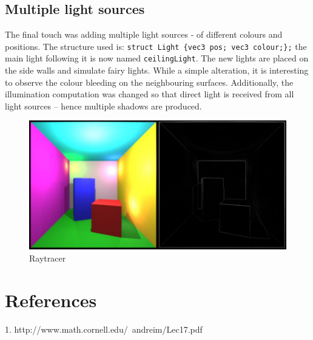 \documentclass[DIV=calc, paper=a4, fontsize=11pt, twocolumn]{article}	 %
\begin{document}
	\subsection*{Multiple light sources}
	The final touch was adding multiple light sources - of different colours and positions. The structure used is: \texttt{struct Light \{vec3 pos; vec3 colour;\};} the main light following it is now named \texttt{ceilingLight}. The new lights are placed on the side walls and simulate fairy lights. While a simple alteration, it is interesting to observe the colour bleeding on the neighbouring surfaces. Additionally, the illumination computation was changed so that direct light is received from all light sources -- hence multiple shadows are produced.
	\begin{figure}[!htp]
		\begin{minipage}{.95\linewidth}
			\includegraphics[width=\linewidth]{raytracer_final.jpg}
			\captionsetup{belowskip=4pt,aboveskip=-11pt}
			\caption{Raytracer}
			\label{graph}
		\end{minipage}
	\end{figure}
	

	\section*{References}
	1. http://www.math.cornell.edu/~andreim/Lec17.pdf
\end{document}
